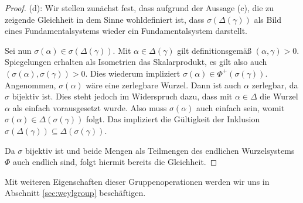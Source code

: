 \begin{proof}
  (d):
  Wir stellen zunächst fest, dass aufgrund der Aussage (c), die zu zeigende Gleichheit in dem Sinne wohldefiniert ist, dass $\sigma(\Delta(\gamma))$ als Bild eines Fundamentalsystems wieder ein Fundamentalsystem darstellt.

  Sei nun $\sigma(\alpha) \in \sigma(\Delta(\gamma))$.
  Mit $\alpha \in \Delta(\gamma)$ gilt definitionsgemäß $(\alpha, \gamma) > 0$.
  Spiegelungen erhalten als Isometrien das Skalarprodukt, es gilt also auch $(\sigma(\alpha), \sigma(\gamma)) > 0$.
  Dies wiederum impliziert $\sigma(\alpha) \in \Phi^+(\sigma(\gamma))$.
  Angenommen, $\sigma(\alpha)$ wäre eine zerlegbare Wurzel.
  Dann ist auch $\alpha$ zerlegbar, da $\sigma$ bijektiv ist.
  Dies steht jedoch im Widerspruch dazu, dass mit $\alpha \in \Delta$ die Wurzel $\alpha$ als einfach vorausgesetzt wurde.
  Also muss $\sigma(\alpha)$ auch einfach sein, womit $\sigma(\alpha) \in \Delta(\sigma(\gamma))$ folgt.
  Das impliziert die Gültigkeit der Inklusion $\sigma(\Delta(\gamma)) \subseteq \Delta(\sigma(\gamma))$.
  
  Da $\sigma$ bijektiv ist und beide Mengen als Teilmengen des endlichen Wurzelsystems $\Phi$ auch endlich sind, folgt hiermit bereits die Gleichheit.
\end{proof}

Mit weiteren Eigenschaften dieser Gruppenoperationen werden wir uns in Abschnitt \ref{sec:weylgroup} beschäftigen.
